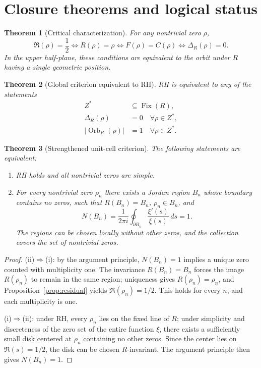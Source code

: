 \documentclass[11pt]{amsart}
\newtheorem{theorem}{Theorem}[section]
\theoremstyle{definition}
\theoremstyle{remark}
\begin{document}
\section{Closure theorems and logical status}
\begin{theorem}[Critical characterization]
For any nontrivial zero $\rho$,
\begin{equation}
 \Re(\rho)=\frac12
 \iff R(\rho)=\rho
 \iff F(\rho)=C(\rho)
 \iff \Delta_R(\rho)=0.
\end{equation}
In the upper half-plane, these conditions are equivalent to the orbit under $R$ having a single geometric position.
\end{theorem}

\begin{theorem}[Global criterion equivalent to RH]
RH is equivalent to any of the statements
\begin{align}
 Z^*&\subseteq\operatorname{Fix}(R),\\
 \Delta_R(\rho)&=0\quad\forall\rho\in Z^*,\\
 |\operatorname{Orb}_R(\rho)|&=1\quad\forall\rho\in Z^*.
\end{align}
\end{theorem}

\begin{theorem}[Strengthened unit-cell criterion]\label{thm:unitcells}
The following statements are equivalent:
\begin{enumerate}[label=(\roman*)]
\item RH holds and all nontrivial zeros are simple.
\item For every nontrivial zero $\rho_n$ there exists a Jordan region $B_n$ whose boundary contains no zeros, such that $R(B_n)=B_n$, $\rho_n\in B_n$, and
\[
N(B_n)=\frac{1}{2\pi i}\oint_{\partial B_n}\frac{\xi'(s)}{\xi(s)}\,ds=1.
\]
The regions can be chosen locally without other zeros, and the collection covers the set of nontrivial zeros.
\end{enumerate}
\end{theorem}

\begin{proof}
(ii)$\Rightarrow$(i): by the argument principle, $N(B_n)=1$ implies a unique zero counted with multiplicity one. The invariance $R(B_n)=B_n$ forces the image $R(\rho_n)$ to remain in the same region; uniqueness gives $R(\rho_n)=\rho_n$, and Proposition~\ref{prop:residual} yields $\Re(\rho_n)=1/2$. This holds for every $n$, and each multiplicity is one.

(i)$\Rightarrow$(ii): under RH, every $\rho_n$ lies on the fixed line of $R$; under simplicity and discreteness of the zero set of the entire function $\xi$, there exists a sufficiently small disk centered at $\rho_n$ containing no other zeros. Since the center lies on $\Re(s)=1/2$, the disk can be chosen $R$-invariant. The argument principle then gives $N(B_n)=1$.
\end{proof}
\end{document}
